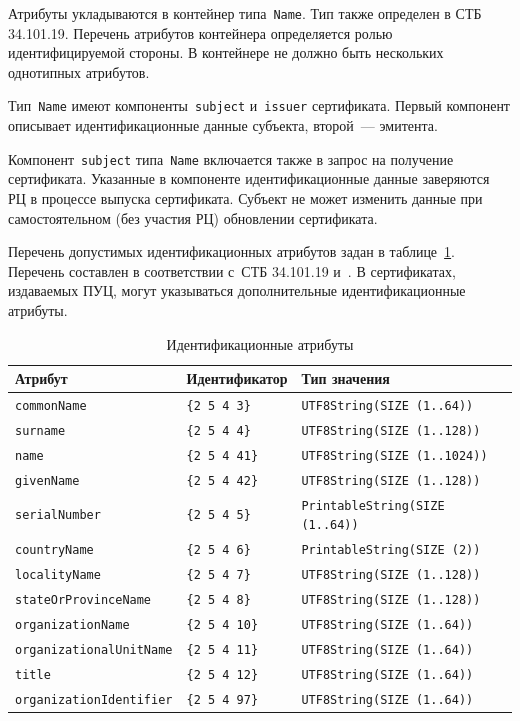 Атрибуты укладываются в контейнер типа~\texttt{Name}. Тип также определен в 
СТБ 34.101.19. Перечень атрибутов контейнера определяется ролью идентифицируемой 
стороны. В контейнере не должно быть нескольких однотипных атрибутов.

Тип~\texttt{Name} имеют компоненты~\texttt{subject} и~\texttt{issuer} 
сертификата. Первый компонент описывает идентификационные данные субъекта, 
второй~--- эмитента.

Компонент~\texttt{subject} типа~\texttt{Name} включается также в запрос на 
получение сертификата. Указанные в компоненте идентификационные данные
заверяются РЦ в процессе выпуска сертификата. Субъект не может изменить 
данные при самостоятельном (без участия РЦ) обновлении сертификата. 

Перечень допустимых идентификационных атрибутов задан в 
таблице~\ref{Table.ENTITIES.Attrs}. Перечень составлен в соответствии 
с~СТБ 34.101.19 и~\cite{X520}. 
%
В сертификатах, издаваемых ПУЦ, могут указываться дополнительные  
идентификационные атрибуты.

\begin{table}[H]
\caption{Идентификационные атрибуты}
\label{Table.ENTITIES.Attrs}
\begin{tabular}{|l|l|l|}
\hline
Атрибут & Идентификатор & Тип значения\\
\hline
\hline
\texttt{commonName} & \verb|{2 5 4 3}| & \texttt{UTF8String(SIZE (1..64))}\\
\texttt{surname} & \verb|{2 5 4 4}| & \texttt{UTF8String(SIZE (1..128))}\\
\texttt{name} & \verb|{2 5 4 41}| & \texttt{UTF8String(SIZE (1..1024))}\\
\texttt{givenName} & \verb|{2 5 4 42}| & \texttt{UTF8String(SIZE (1..128))}\\
\texttt{serialNumber} & \verb|{2 5 4 5}| & \texttt{PrintableString(SIZE (1..64))}\\
\texttt{countryName} & \verb|{2 5 4 6}| & \texttt{PrintableString(SIZE (2))}\\
\texttt{localityName} & \verb|{2 5 4 7}| & \texttt{UTF8String(SIZE (1..128))}\\
\texttt{stateOrProvinceName} & \verb|{2 5 4 8}| & \texttt{UTF8String(SIZE (1..128))}\\
\texttt{organizationName} & \verb|{2 5 4 10}| & \texttt{UTF8String(SIZE (1..64))}\\
\texttt{organizationalUnitName} & \verb|{2 5 4 11}| & \texttt{UTF8String(SIZE (1..64))}\\
\texttt{title} & \verb|{2 5 4 12}| & \texttt{UTF8String(SIZE (1..64))}\\
\texttt{organizationIdentifier} & \verb|{2 5 4 97}| & \texttt{UTF8String(SIZE (1..64))}\\
\hline                                      
\end{tabular}
\end{table}

